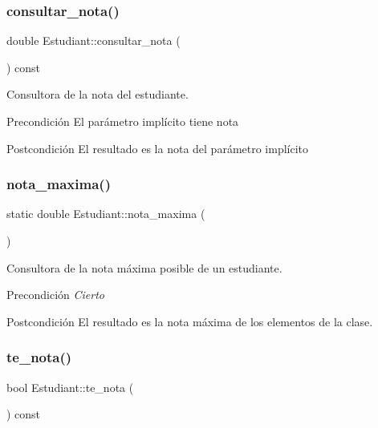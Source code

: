 \subsubsection{\texorpdfstring{consultar\+\_\+nota()}{consultar\_nota()}}
{\footnotesize\ttfamily double Estudiant\+::consultar\+\_\+nota (\begin{DoxyParamCaption}{ }\end{DoxyParamCaption}) const}



Consultora de la nota del estudiante. 

\begin{DoxyPrecond}{Precondición}
El parámetro implícito tiene nota 
\end{DoxyPrecond}
\begin{DoxyPostcond}{Postcondición}
El resultado es la nota del parámetro implícito 
\end{DoxyPostcond}
\mbox{\label{class_estudiant_a5df5eed414c87a2a1c2efa4194633afd}} 
\subsubsection{\texorpdfstring{nota\+\_\+maxima()}{nota\_maxima()}}
{\footnotesize\ttfamily static double Estudiant\+::nota\+\_\+maxima (\begin{DoxyParamCaption}{ }\end{DoxyParamCaption})\hspace{0.3cm}{\ttfamily [static]}}



Consultora de la nota máxima posible de un estudiante. 

\begin{DoxyPrecond}{Precondición}
{\itshape Cierto} 
\end{DoxyPrecond}
\begin{DoxyPostcond}{Postcondición}
El resultado es la nota máxima de los elementos de la clase. 
\end{DoxyPostcond}
\mbox{\label{class_estudiant_a81f265e635e1fe198867a5b594359e1b}} 
\subsubsection{\texorpdfstring{te\+\_\+nota()}{te\_nota()}}
{\footnotesize\ttfamily bool Estudiant\+::te\+\_\+nota (\begin{DoxyParamCaption}{ }\end{DoxyParamCaption}) const}



